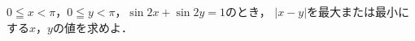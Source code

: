 \documentclass[../../main.tex]{subfiles}
\begin{document}
$0 \leqq x<\pi$，$0 \leqq y<\pi$，$\sin2x+\sin2y=1$のとき，
$|x-y|$を最大または最小にする$x$，$y$の値を求めよ．
\end{document}
